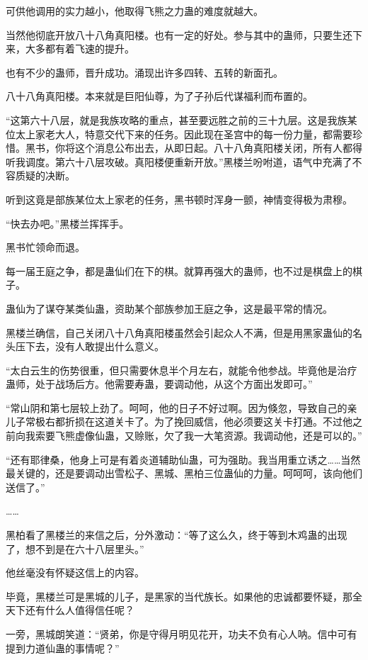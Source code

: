 \begin{this_body}
可供他调用的实力越小，他取得飞熊之力蛊的难度就越大。

当然他彻底开放八十八角真阳楼。也有一定的好处。参与其中的蛊师，只要生还下来，大多都有着飞速的提升。

也有不少的蛊师，晋升成功。涌现出许多四转、五转的新面孔。

八十八角真阳楼。本来就是巨阳仙尊，为了子孙后代谋福利而布置的。

“这第六十八层，就是我族攻略的重点，甚至要远胜之前的三十九层。这是我族某位太上家老大人，特意交代下来的任务。因此现在圣宫中的每一份力量，都需要珍惜。黑书，你将这个消息公布出去，从即日起。八十八角真阳楼关闭，所有人都得听我调度。第六十八层攻破。真阳楼便重新开放。”黑楼兰吩咐道，语气中充满了不容质疑的决断。

听到这竟是部族某位太上家老的任务，黑书顿时浑身一颤，神情变得极为肃穆。

“快去办吧。”黑楼兰挥挥手。

黑书忙领命而退。

每一届王庭之争，都是蛊仙们在下的棋。就算再强大的蛊师，也不过是棋盘上的棋子。

蛊仙为了谋夺某类仙蛊，资助某个部族参加王庭之争，这是最平常的情况。

黑楼兰确信，自己关闭八十八角真阳楼虽然会引起众人不满，但是用黑家蛊仙的名头压下去，没有人敢提出什么意义。

“太白云生的伤势很重，但只需要休息半个月左右，就能令他参战。毕竟他是治疗蛊师，处于战场后方。他需要寿蛊，要调动他，从这个方面出发即可。”

“常山阴和第七层较上劲了。呵呵，他的日子不好过啊。因为倏忽，导致自己的亲儿子常极右都折损在这道关卡了。为了挽回威信，他必须要这关卡打通。不过他之前向我索要飞熊虚像仙蛊，又赊账，欠了我一大笔资源。我调动他，还是可以的。”

“还有耶律桑，他身上可是有着炎道辅助仙蛊，可为强助。我当用重立诱之……当然最关键的，还是要调动出雪松子、黑城、黑柏三位蛊仙的力量。呵呵呵，该向他们送信了。”

……

黑柏看了黑楼兰的来信之后，分外激动：“等了这么久，终于等到木鸡蛊的出现了，想不到是在六十八层里头。”

他丝毫没有怀疑这信上的内容。

毕竟，黑楼兰可是黑城的儿子，是黑家的当代族长。如果他的忠诚都要怀疑，那全天下还有什么人值得信任呢？

一旁，黑城朗笑道：“贤弟，你是守得月明见花开，功夫不负有心人呐。信中可有提到力道仙蛊的事情呢？”


\end{this_body}
